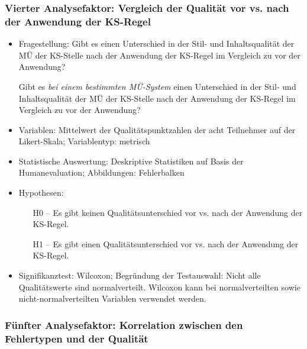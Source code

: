 \subsubsection{Vierter Analysefaktor: Vergleich der Qualität vor vs. nach der Anwendung der KS-Regel}

\begin{itemize}
\item Fragestellung: Gibt es einen Unterschied in der Stil- und Inhaltsqualität der MÜ der KS-Stelle nach der Anwendung der KS-Regel im Vergleich zu vor der Anwendung?

Gibt es \textit{bei einem bestimmten MÜ-System} einen Unterschied in der Stil- und Inhaltsqualität der MÜ der KS-Stelle nach der Anwendung der KS-Regel im Vergleich zu vor der Anwendung?

\item Variablen: Mittelwert der Qualitätspunktzahlen der acht Teilnehmer auf der Likert-Skala; Variablentyp: metrisch
\item Statistische Auswertung: Deskriptive Statistiken auf Basis der Humanevaluation; Abbildungen: Fehlerbalken
\item Hypothesen:
  \begin{itemize}[align=left]

  \item[H0 --] Es gibt keinen Qualitätsunterschied vor vs. nach der Anwendung der KS-Regel.

  \item[H1 --] Es gibt einen Qualitätsunterschied vor vs. nach der Anwendung der KS-Regel.

  \end{itemize}
\item Signifikanztest: Wilcoxon; Begründung der Testauswahl: Nicht alle Qualitätswerte sind normalverteilt. Wilcoxon kann bei normalverteilten sowie nicht-normalverteilten Variablen verwendet werden.
\end{itemize}

\subsubsection{Fünfter Analysefaktor: Korrelation zwischen den Fehlertypen und der Qualität}

